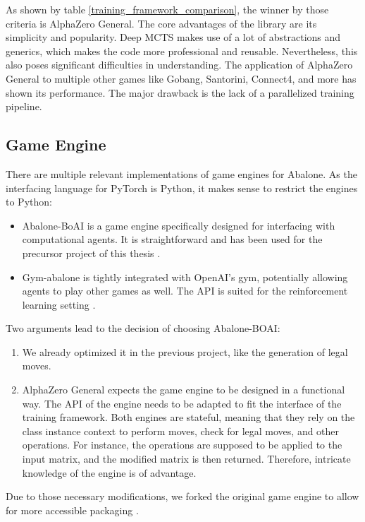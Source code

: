 As shown by table \ref{training_framework_comparison}, the winner by those criteria is AlphaZero General. The core advantages of the library are its simplicity and popularity. Deep MCTS makes use of a lot of abstractions and generics, which makes the code more professional and reusable. Nevertheless, this also poses significant difficulties in understanding. The application of AlphaZero General to multiple other games like Gobang, Santorini, Connect4, and more has shown its performance. The major drawback is the lack of a parallelized training pipeline.

\subsection{Game Engine}
There are multiple relevant implementations of game engines for Abalone. As the interfacing language for PyTorch is Python, it makes sense to restrict the engines to Python:

\begin{itemize}
    \item Abalone-BoAI is a game engine specifically designed for interfacing with computational agents. It is straightforward and has been used for the precursor project of this thesis \cite{scriptim_scriptimabalone-boai_2021}.
    \item Gym-abalone is tightly integrated with OpenAI's gym, potentially allowing agents to play other games as well. The API is suited for the reinforcement learning setting \cite{towzeur_towzeurgym-abalone_2021}.
\end{itemize}

Two arguments lead to the decision of choosing Abalone-BOAI:
\begin{enumerate}
    \item We already optimized it in the previous project, like the generation of legal moves.
    \item AlphaZero General expects the game engine to be designed in a functional way. The API of the engine needs to be adapted to fit the interface of the training framework. Both engines are stateful, meaning that they rely on the class instance context to perform moves, check for legal moves, and other operations. For instance, the operations are supposed to be applied to the input matrix, and the modified matrix is then returned. Therefore, intricate knowledge of the engine is of advantage.
\end{enumerate}

Due to those necessary modifications, we forked the original game engine to allow for more accessible packaging \cite{claussen_campfiremanabalone-boai_2021}.

